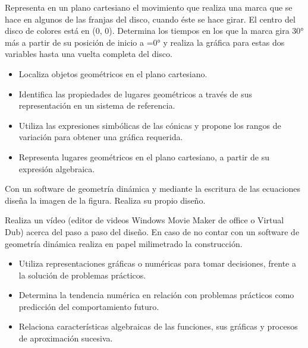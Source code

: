 Representa en un plano cartesiano el movimiento que realiza una marca que se hace en algunos de las franjas del disco, cuando éste se hace girar. El centro del disco de colores está en (0, 0). Determina los tiempos en los que la marca gira 30° más a partir de su posición de inicio a =0° y realiza la gráfica para estas dos variables hasta una vuelta completa del disco.


\evidencias

\begin{itemize}
  \item Localiza objetos geométricos en el plano cartesiano.
  \item Identifica las propiedades de lugares geométricos a través de sus representación en un sistema de referencia.
  \item Utiliza las expresiones simbólicas de las cónicas y propone los rangos de variación para obtener una gráfica requerida.
  \item Representa lugares geométricos en el plano cartesiano, a partir de su expresión algebraica.
\end{itemize}

\ejemplo

Con un software de geometría dinámica y mediante la escritura de las ecuaciones diseña la imagen de la figura. Realiza su propio diseño.

Realiza un vídeo (editor de videos Windows Movie Maker de office o Virtual Dub) acerca del paso a paso del diseño. En caso de no contar con un software de geometría dinámica realiza en papel milimetrado la construcción.


\evidencias

\begin{itemize}
  \item Utiliza representaciones gráficas o numéricas para tomar decisiones, frente a la solución de problemas prácticos.
  \item Determina la tendencia numérica en relación con problemas prácticos como predicción del comportamiento futuro.
  \item Relaciona características algebraicas de las funciones, sus gráficas y procesos de aproximación sucesiva.
\end{itemize}

